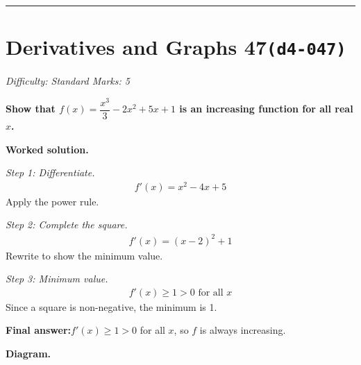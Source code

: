 \documentclass[11pt]{article}
\newcommand{\question}[1]{\par\medskip\noindent\textbf{#1}\par}
\begin{document}
\medskip\hrule

\section*{Derivatives and Graphs 47\quad\small\texttt{(d4-047)}}
\textit{Difficulty: Standard \quad\textbar\quad Marks: 5}

\question{Show that \( f(x) = \dfrac{x^3}{3} - 2x^2 + 5x + 1 \) is an increasing function for all real \( x \).}

\textbf{Worked solution.}

\textit{Step 1: Differentiate.}
\[\begin{gathered}
f'(x) = x^2 - 4x + 5
\end{gathered}\]
Apply the power rule.

\textit{Step 2: Complete the square.}
\[\begin{gathered}
f'(x) = (x - 2)^2 + 1
\end{gathered}\]
Rewrite to show the minimum value.

\textit{Step 3: Minimum value.}
\[\begin{gathered}
f'(x) \geq 1 > 0 \text{ for all } x
\end{gathered}\]
Since a square is non-negative, the minimum is 1.

\begin{answerbox}
\textbf{Final answer:}\quad \(\displaystyle  f'(x) \geq 1 > 0 \) for all \(\displaystyle  x \), so \(\displaystyle  f \) is always increasing.
\end{answerbox}
\textbf{Diagram.}
\end{document}
